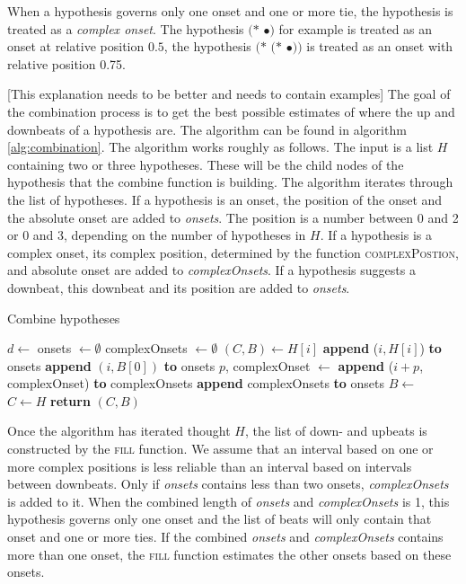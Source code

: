 When a hypothesis governs only one onset and one or more tie, the hypothesis is treated as a \textit{complex onset}. The hypothesis $(*$ $\bullet)$ for example is treated as an onset at relative position $0.5$, the hypothesis $(*$ $(*$ $\bullet))$ is treated as an onset with relative position 0.75.

[This explanation needs to be better and needs to contain examples]
The goal of the combination process is to get the best possible estimates of where the up and downbeats of a hypothesis are. The algorithm can be found in algorithm \ref{alg:combination}. The algorithm works roughly as follows. The input is a list $H$ containing two or three hypotheses. These will be the child nodes of the hypothesis that the combine function is building. The algorithm iterates through the list of hypotheses. If a hypothesis is an onset, the position of the onset and the absolute onset are added to \textit{onsets}. The position is a number between 0 and 2 or 0 and 3, depending on the number of hypotheses in $H$. If a hypothesis is a complex onset, its complex position, determined by the function \textsc{complexPostion}, and absolute onset are added to \textit{complexOnsets}. If a hypothesis suggests a downbeat, this downbeat and its position are added to \textit{onsets}.

\begin{algorithm}
\caption{Combine hypotheses}
\label{alg:combination}
\begin{algorithmic}
	\State $d \leftarrow$ 
	\State onsets $\leftarrow \emptyset$
	\State complexOnsets $\leftarrow \emptyset$
		\State $(C, B) \leftarrow H[i]$
			\State \textbf{append} ($i, H[i]$) \textbf{to} onsets
		\Else
				\State \textbf{append} $(i, B[0])$ \textbf{to} onsets
			\Else
				\State $p$, complexOnset $\leftarrow$ 
				\State \textbf{append} ($i + p$, complexOnset) \textbf{to} complexOnsets
			\EndIf
		\EndIf
	\EndFor
		\State \textbf{append} complexOnsets \textbf{to} onsets
	\EndIf
	\State $B \leftarrow$ 
	\State $C \leftarrow H$
	\State \textbf{return} $(C, B)$
\EndFunction
\end{algorithmic}
\end{algorithm}

Once the algorithm has iterated thought $H$, the list of down- and upbeats is constructed by the \textsc{fill} function. We assume that an interval based on one or more complex positions is less reliable than an interval based on intervals between downbeats. Only if \textit{onsets} contains less than two onsets, \textit{complexOnsets} is added to it. When the combined length of \textit{onsets} and \textit{complexOnsets} is 1, this hypothesis governs only one onset and the list of beats will only contain that onset and one or more ties. If the combined \textit{onsets} and \textit{complexOnsets} contains more than one onset, the \textsc{fill} function estimates the other onsets based on these onsets.


